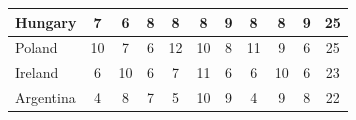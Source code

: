 \documentclass[12pt]{article}  %
\begin{document}
\begin{subappendices}
\begin{longtable}{|l|c|c|c|c|c|c|c|c|c|c|}
	\hline
	Hungary                                                        & 7                                                                      & 6                                                                      & 8                                                                      & 8                                                                      & 8                                                                      & 9                                                                      & 8                         & 8                           & 9                           & 25                          \\ 
	\hline
	Poland                                                         & 10                                                                     & 7                                                                      & 6                                                                      & 12                                                                     & 10                                                                     & 8                                                                      & 11                        & 9                           & 6                           & 25                          \\ 
	\hline
	Ireland                                                        & 6                                                                      & 10                                                                     & 6                                                                      & 7                                                                      & 11                                                                     & 6                                                                      & 6                         & 10                          & 6                           & 23                          \\ 
	\hline
	Argentina                                                      & 4                                                                      & 8                                                                      & 7                                                                      & 5                                                                      & 10                                                                     & 9                                                                      & 4                         & 9                           & 8                           & 22                          \\ 

\end{longtable}
\end{subappendices}
\end{document}
